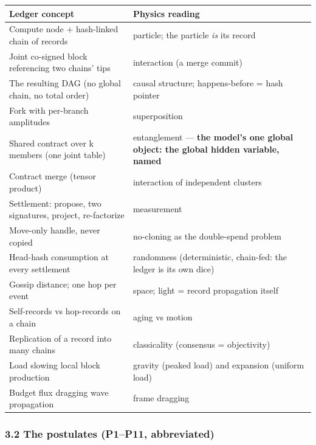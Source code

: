 \documentclass[
  11pt,
]{article}
\newcounter{none} %
\begin{document}
{\def\LTcaptype{none} %
\begin{longtable}[]{@{}
  >{\raggedright\arraybackslash}p{}
  >{\raggedright\arraybackslash}p{}@{}}
\toprule\noalign{}
\begin{minipage}[b]{\linewidth}\raggedright
Ledger concept
\end{minipage} & \begin{minipage}[b]{\linewidth}\raggedright
Physics reading
\end{minipage} \\
\midrule\noalign{}
\endhead
\bottomrule\noalign{}
\endlastfoot
Compute node + hash-linked chain of records & particle; the particle
\emph{is} its record \\
Joint co-signed block referencing two chains' tips & interaction (a
merge commit) \\
The resulting DAG (no global chain, no total order) & causal structure;
happens-before = hash pointer \\
Fork with per-branch amplitudes & superposition \\
Shared contract over k members (one joint table) & entanglement ---
\textbf{the model's one global object: the global hidden variable,
named} \\
Contract merge (tensor product) & interaction of independent clusters \\
Settlement: propose, two signatures, project, re-factorize &
measurement \\
Move-only handle, never copied & no-cloning as the double-spend
problem \\
Head-hash consumption at every settlement & randomness (deterministic,
chain-fed: the ledger is its own dice) \\
Gossip distance; one hop per event & space; light = record propagation
itself \\
Self-records vs hop-records on a chain & aging vs motion \\
Replication of a record into many chains & classicality (consensus =
objectivity) \\
Load slowing local block production & gravity (peaked load) and
expansion (uniform load) \\
Budget flux dragging wave propagation & frame dragging \\
\end{longtable}
}

\subsubsection{3.2 The postulates (P1--P11,
abbreviated)}\label{the-postulates-p1p11-abbreviated}
\end{document}
